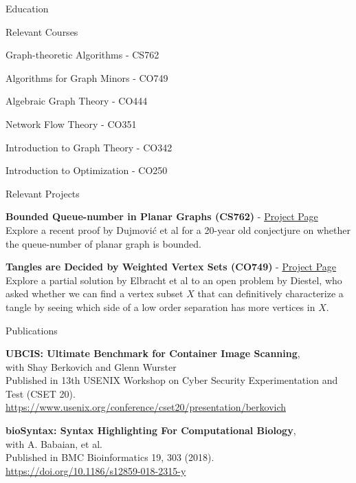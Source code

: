 \documentclass{cv}
\begin{document}
\begin{rSection}{Education}
\begin{rSubsection}{Relevant Courses}{}{}{}
	\item Graph-theoretic Algorithms - CS762
	\item Algorithms for Graph Minors - CO749
	\item Algebraic Graph Theory - CO444
	\item Network Flow Theory - CO351
	\item Introduction to Graph Theory - CO342
	\item Introduction to Optimization - CO250
\end{rSubsection}

\begin{rSubsection}{Relevant Projects}{}{}{}	
	\item \textbf{Bounded Queue-number in Planar Graphs (CS762)} - \href{https://jeffreyhykam.com/writings/}{Project Page}\\
	Explore a recent proof by Dujmovi\'{c} et al \cite{queue} for a 20-year old conjectjure on whether the queue-number of planar graph is bounded. \\

	\item \textbf{Tangles are Decided by Weighted Vertex Sets (CO749)} - \href{https://jeffreyhykam.com/writings/}{Project Page}\\
	Explore a partial solution by Elbracht et al \cite{tangle} to an open problem by Diestel, who asked whether we can find a vertex subset $X$ that can definitively characterize a tangle by seeing which side of a low order separation has more vertices in $X$. 
\end{rSubsection}
\end{rSection}

\begin{rSection}{Publications}
\begin{rSubsectionPure}
	\item \textbf{{UBCIS}: Ultimate Benchmark for Container Image Scanning}, \\
	with Shay Berkovich and Glenn Wurster \\
	Published in 13th {USENIX} Workshop on Cyber Security Experimentation and Test ({CSET} 20). \\
	\href{https://www.usenix.org/conference/cset20/presentation/berkovich}{https://www.usenix.org/conference/cset20/presentation/berkovich}
\end{rSubsectionPure}

\begin{rSubsectionPure}
	\item \textbf{bioSyntax: Syntax Highlighting For Computational Biology}, \\
	with A. Babaian, et al. \\
	Published in BMC Bioinformatics 19, 303 (2018). \\
	\href{https://doi.org/10.1186/s12859-018-2315-y}{https://doi.org/10.1186/s12859-018-2315-y}
\end{rSubsectionPure}
\end{rSection}
\end{document}
